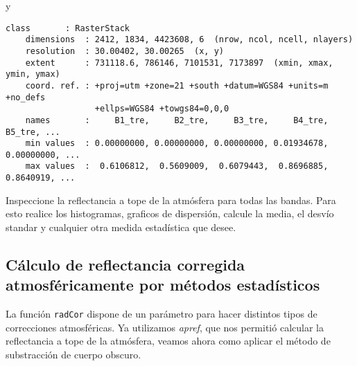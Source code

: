 \begin{exa}
    y

    \begin{Verbatim}[fontsize=\small]
    class       : RasterStack
    dimensions  : 2412, 1834, 4423608, 6  (nrow, ncol, ncell, nlayers)
    resolution  : 30.00402, 30.00265  (x, y)
    extent      : 731118.6, 786146, 7101531, 7173897  (xmin, xmax, ymin, ymax)
    coord. ref. : +proj=utm +zone=21 +south +datum=WGS84 +units=m +no_defs
                  +ellps=WGS84 +towgs84=0,0,0
    names       :     B1_tre,     B2_tre,     B3_tre,     B4_tre,     B5_tre, ...
    min values  : 0.00000000, 0.00000000, 0.00000000, 0.01934678, 0.00000000, ...
    max values  :  0.6106812,  0.5609009,  0.6079443,  0.8696885,  0.8640919, ...
    \end{Verbatim}

    \end{exa}

\begin{act}
    Inspeccione la reflectancia a tope de la atm\'osfera para todas las bandas.
    Para esto realice los histogramas, graficos de dispersi\'on, calcule la media,
    el desv\'io standar y cualquier otra medida estad\'istica que desee.
\end{act}
\subsection{C\'alculo de reflectancia corregida atmosf\'ericamente por m\'etodos
            estad\'isticos}

La funci\'on \texttt{radCor} dispone de un par\'ametro para hacer distintos
tipos de correcciones atmosf\'ericas. Ya utilizamos \emph{apref}, que nos permiti\'o
calcular la reflectancia a tope de la atm\'osfera, veamos ahora como aplicar el m\'etodo
de substracci\'on de cuerpo obscuro.

